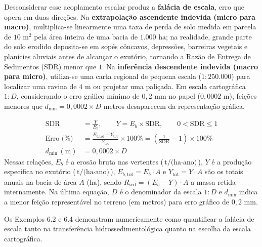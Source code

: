 Desconsiderar esse acoplamento escalar produz a \textbf{falácia de escala}, erro que opera em duas direções. Na \textbf{extrapolação ascendente indevida (micro para macro)}, multiplica-se linearmente uma taxa de perda de solo medida em parcela de $10\text{ m}^2$ pela área inteira de uma bacia de $1.000\text{ ha}$; na realidade, grande parte do solo erodido deposita-se em sopés côncavos, depressões, barreiras vegetais e planícies aluviais antes de alcançar o exutório, tornando a Razão de Entrega de Sedimentos (SDR) menor que $1$. Na \textbf{inferência descendente indevida (macro para micro)}, utiliza-se uma carta regional de pequena escala ($1{:}250.000$) para localizar uma ravina de $4\text{ m}$ ou projetar uma paliçada. Em escala cartográfica $1{:}D$, considerando o erro gráfico mínimo de $0{,}2\text{ mm}$ no papel ($0{,}0002\text{ m}$), feições menores que $d_{\min} = 0{,}0002 \times D$ metros desaparecem da representação gráfica.

\begin{boxFormula}
\begin{align*}
  \text{SDR} &= \frac{Y}{E_b}, \qquad Y = E_b \times \text{SDR}, \qquad 0 < \text{SDR} \le 1 \\[4pt]
  \text{Erro (\%)} &= \frac{E_{b,\text{tot}} - Y_{\text{tot}}}{Y_{\text{tot}}} \times 100\% = \left(\frac{1}{\text{SDR}} - 1\right) \times 100\% \\[4pt]
  d_{\min}\,(\text{m}) &= 0{,}0002 \times D
\end{align*}
Nessas relações, $E_b$ é a erosão bruta nas vertentes ($\text{t/(ha}\cdot\text{ano)}$), $Y$ é a produção específica no exutório ($\text{t/(ha}\cdot\text{ano)}$), $E_{b,\text{tot}} = E_b \cdot A$ e $Y_{\text{tot}} = Y \cdot A$ são os totais anuais na bacia de área $A$ ($\text{ha}$), sendo $R_{\text{sed}} = (E_b - Y)\cdot A$ a massa retida internamente. Na última equação, $D$ é o denominador da escala $1{:}D$ e $d_{\min}$ indica a menor feição representável no terreno (em metros) para erro gráfico de $0{,}2\text{ mm}$.
\end{boxFormula}

Os Exemplos 6.2 e 6.4 demonstram numericamente como quantificar a falácia de escala tanto na transferência hidrossedimentológica quanto na escolha da escala cartográfica.

